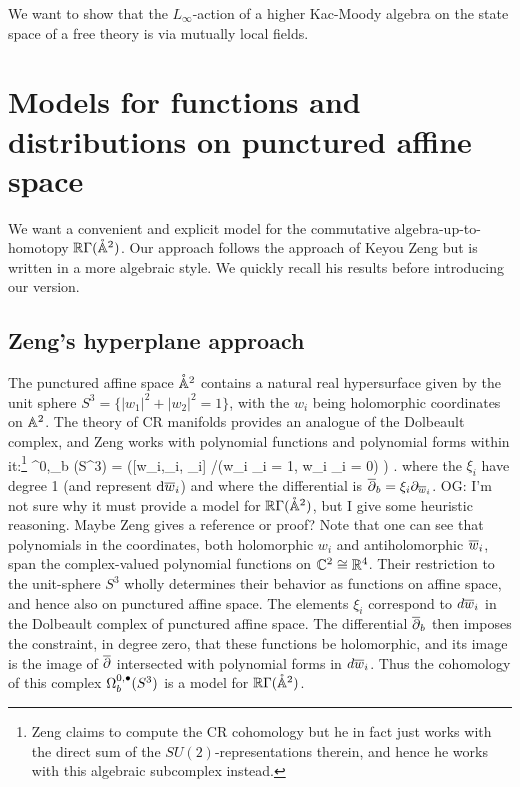 \documentclass[11pt]{amsart}
\def\del{\partial}
\def\C{{\mathbb{C}}}
\def\owen#1{{\textcolor{violet!65!black}{OG: {#1}}}}
\begin{document}
We want to show that the $L_\infty$-action of a higher Kac-Moody algebra on the state space of a free theory is via mutually local fields.

\newpage

\section{Models for functions and distributions on punctured affine space}

We want a convenient and explicit model for the commutative algebra-up-to-homotopy $\RR \Gamma(\mathring{\AA}^2)$.
Our approach follows the approach of Keyou Zeng but is written in a more algebraic style.
We quickly recall his results before introducing our version.

\subsection{Zeng's hyperplane approach}

The punctured affine space $\mathring{\AA}^2$ contains a natural real hypersurface given by the unit sphere $S^3 = \{|w_1|^2 + |w_2|^2 = 1\}$, with the $w_i$ being holomorphic coordinates on $\AA^2$.
The theory of CR manifolds provides an analogue of the Dolbeault complex, 
and Zeng works with polynomial functions and polynomial forms within it:\footnote{Zeng claims to compute the CR cohomology but he in fact just works with the direct sum of the $SU(2)$-representations therein, and hence he works with this algebraic subcomplex instead.}
\beqn
\Omega^{0,\bu}_b (S^3) = \big(\C[w_i,_i, \xi_i] \slash (w_i _i = 1, w_i \xi_i = 0) \big) .
\eeqn
where the $\xi_i$ have degree 1 (and represent $\d \Bar{w}_i$) and where the differential is $\dbar_b = \xi_i \del_{\Bar{w}_i}$.
\owen{I'm not sure why it must provide a model for $\RR \Gamma(\mathring{\AA}^2)$, but I give some heuristic reasoning. Maybe Zeng gives a reference or proof?}
Note that one can see that polynomials in the coordinates, both holomorphic $w_i$ and antiholomorphic $\Bar{w}_i$, span the complex-valued polynomial functions on $\CC^2 \cong \RR^4$.
Their restriction to the unit-sphere $S^3$ wholly determines their behavior as functions on affine space, and hence also on punctured affine space. 
The elements $\xi_i$ correspond to $d\Bar{w}_i$ in the Dolbeault complex of punctured affine space.
The differential $\dbar_b$ then imposes the constraint, in degree zero, that these functions be holomorphic,
and its image is the image of $\dbar$ intersected with polynomial  forms in $d \Bar{w}_i$.
Thus the cohomology of this complex $\Omega^{0,\bu}_b (S^3)$ is a model for $\RR \Gamma(\mathring{\AA}^2)$.
\end{document}

